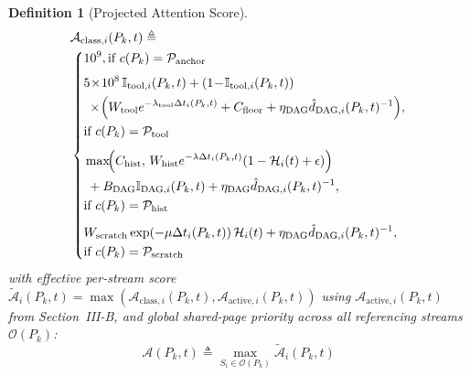 \documentclass[conference,10pt]{IEEEtran}
\newtheorem{definition}{Definition}
\begin{document}
\begin{definition}[Projected Attention Score]
\begin{equation}
\label{eq:ella_score}
\begin{aligned}
&\mathcal{A}_{\text{class},i}(P_k, t) \triangleq \\
&\left\{\begin{aligned}
&10^9, \hfill \text{if } c(P_k) = \mathcal{P}_{\text{anchor}} \\[3pt]
&5\!\times\!10^8\,\mathbb{I}_{\text{tool},i}(P_k, t) + (1\!-\!\mathbb{I}_{\text{tool},i}(P_k, t)) \\
&\; \times\!\Bigl(W_{\text{tool}} e^{-\lambda_{\text{tool}}\Delta t_i(P_k, t)} + C_{\text{floor}} + \eta_{\text{DAG}}\hat{d}_{\text{DAG},i}(P_k, t)^{-1}\Bigr), \\
&\hfill \text{if } c(P_k) = \mathcal{P}_{\text{tool}} \\[4pt]
&\max\!\Bigl(C_{\text{hist}},\, W_{\text{hist}} e^{-\lambda \Delta t_i(P_k, t)}(1 - \mathcal{H}_i(t) + \epsilon)\Bigr) \\
&\; + B_{\text{DAG}}\mathbb{I}_{\text{DAG},i}(P_k, t) + \eta_{\text{DAG}}\hat{d}_{\text{DAG},i}(P_k, t)^{-1}, \\
&\hfill \text{if } c(P_k) = \mathcal{P}_{\text{hist}} \\[4pt]
&W_{\text{scratch}} \exp(-\mu \Delta t_i(P_k, t))\,\mathcal{H}_i(t) + \eta_{\text{DAG}}\hat{d}_{\text{DAG},i}(P_k, t)^{-1}, \\
&\hfill \text{if } c(P_k) = \mathcal{P}_{\text{scratch}}
\end{aligned}\right.
\end{aligned}
\end{equation}
with effective per-stream score $\tilde{\mathcal{A}}_i(P_k, t) = \max(\mathcal{A}_{\text{class},i}(P_k, t), \mathcal{A}_{\text{active}, i}(P_k, t))$ using $\mathcal{A}_{\text{active}, i}(P_k, t)$ from Section~III-B, and global shared-page priority across all referencing streams $\mathcal{O}(P_k)$:
\begin{equation}
\label{eq:global_score}
\mathcal{A}(P_k, t) \triangleq \max_{S_i \in \mathcal{O}(P_k)} \tilde{\mathcal{A}}_i(P_k, t)
\end{equation}

\end{definition}
\end{document}
